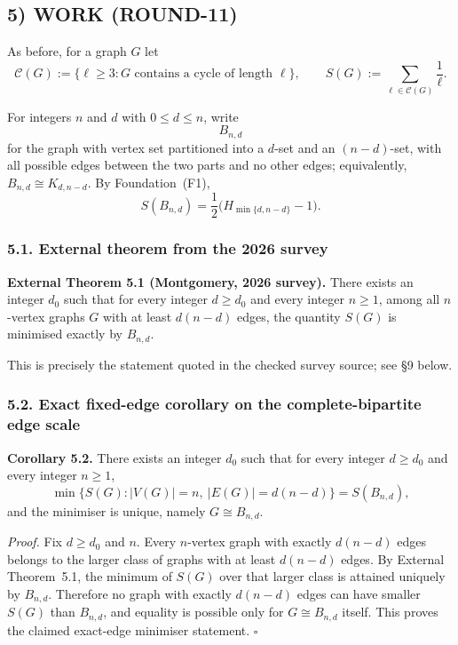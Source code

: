 \subsection*{5) WORK (ROUND-11)}

As before, for a graph $G$ let
\[
\mathcal C(G):=\{\ell\ge 3:\text{$G$ contains a cycle of length $\ell$}\},
\qquad
S(G):=\sum_{\ell\in\mathcal C(G)}\frac1\ell.
\]

For integers $n$ and $d$ with $0\le d\le n$, write
\[
B_{n,d}
\]
for the graph with vertex set partitioned into a $d$-set and an $(n-d)$-set, with all possible edges between the two parts and no other edges; equivalently, $B_{n,d}\cong K_{d,n-d}$.
By Foundation~(F1),
\[
S(B_{n,d})=\frac12\bigl(H_{\min\{d,n-d\}}-1\bigr).
\]

\subsubsection*{5.1. External theorem from the 2026 survey}

\textbf{External Theorem 5.1 (Montgomery, 2026 survey).}
There exists an integer $d_0$ such that for every integer $d\ge d_0$ and every integer $n\ge 1$, among all $n$-vertex graphs $G$ with at least $d(n-d)$ edges, the quantity $S(G)$ is minimised exactly by $B_{n,d}$.

\medskip
\noindent This is precisely the statement quoted in the checked survey source; see \S9 below.

\subsubsection*{5.2. Exact fixed-edge corollary on the complete-bipartite edge scale}

\textbf{Corollary 5.2.}
There exists an integer $d_0$ such that for every integer $d\ge d_0$ and every integer $n\ge 1$,
\[
\min\{S(G): |V(G)|=n,\ |E(G)|=d(n-d)\}=S(B_{n,d}),
\]
and the minimiser is unique, namely $G\cong B_{n,d}$.

\medskip
\textit{Proof.}
Fix $d\ge d_0$ and $n$.
Every $n$-vertex graph with exactly $d(n-d)$ edges belongs to the larger class of graphs with at least $d(n-d)$ edges. By External Theorem~5.1, the minimum of $S(G)$ over that larger class is attained uniquely by $B_{n,d}$.
Therefore no graph with exactly $d(n-d)$ edges can have smaller $S(G)$ than $B_{n,d}$, and equality is possible only for $G\cong B_{n,d}$ itself.
This proves the claimed exact-edge minimiser statement.
\hfill$\square$

